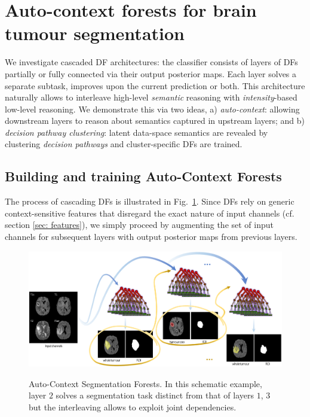 
\section{Auto-context forests for brain tumour segmentation}
\label{sec: cascading}

We investigate cascaded DF architectures: the classifier consists of layers of DFs partially or fully connected via their output posterior maps. Each layer solves a separate subtask, improves upon the current prediction or both. %
This architecture naturally allows to interleave high-level \textit{semantic} reasoning with \textit{intensity}-based low-level reasoning. We demonstrate this via two ideas, a) \textit{auto-context}: allowing downstream layers to reason about semantics captured in upstream layers; and b) \textit{decision pathway clustering}: latent data-space semantics are revealed by clustering \textit{decision pathways} and cluster-specific DFs are trained. 

\subsection{Building and training Auto-Context Forests}

The process of cascading DFs is illustrated in Fig.~\ref{fig: DN concept}. Since DFs rely on generic context-sensitive features %
that disregard the exact nature of input channels (cf. section \ref{sec: features}), we simply proceed by augmenting the set of input channels for subsequent layers with output posterior maps from previous layers. %

\begin{figure}
\centering
\includegraphics[width=1\columnwidth]{images/DecisionNetwork-BRATS.png}
\label{fig: DN concept}
\caption{Auto-Context Segmentation Forests. In this schematic example, layer $2$ solves a segmentation task distinct from that of layers $1$, $3$ but the interleaving allows to exploit joint dependencies.}
\end{figure}

